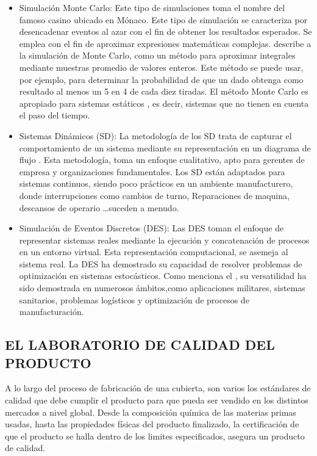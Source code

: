 \begin{itemize}
	\item Simulación Monte Carlo: Este tipo de simulaciones toma el nombre
		del famoso casino ubicado en Mónaco.
		Este tipo de simulación se caracteriza por desencadenar eventos al azar
		con el fin de obtener los resultados esperados.
		Se emplea con el fin de aproximar
		expresiones matemáticas complejas.
		\citet{owen2016monte} describe a la simulación de Monte Carlo,
		como un método para aproximar integrales
		mediante muestras promedio de valores enteros.
		Este método se puede usar, por ejemplo,
		para determinar la probabilidad de que
		un dado obtenga como resultado
		al menos un 5 en 4 de cada diez tiradas.
		El método Monte Carlo es apropiado para sistemas estáticos
		\citep{lawson2008monte},
		es decir, sistemas que no tienen en cuenta el paso del tiempo. 
		
	\item Sistemas Dinámicos (SD): La metodología de los SD trata de capturar
		el comportamiento de un sistema mediante
		su representación en un diagrama de flujo
		\citep{sweetser1999comparison}.
		Esta metodología, toma un enfoque cualitativo,
		apto para gerentes de empresa y organizaciones fundamentales.
		Los SD están adaptados para sistemas continuos,
		siendo poco prácticos en un ambiente manufacturero,
		donde interrupciones como cambios de turno,
		Reparaciones de maquina, descansos de operario \ldots suceden a menudo.

	\item Simulación de Eventos Discretos (DES):
		Las DES toman el enfoque de representar sistemas reales
		mediante la ejecución y concatenación
		de procesos en un entorno virtual.
		Esta representación computacional, se asemeja al sistema real.
		La DES ha demostrado su capacidad de resolver
		problemas de optimización en sistemas estocásticos.
		Como menciona el \citet	{allen2011introduction},
		su versatilidad ha sido demostrada en numerosos ámbitos,como
		aplicaciones militares,
		sistemas sanitarios,
		problemas logísticos
		y optimización de procesos de manufacturación.
\end{itemize}

\subsection{EL LABORATORIO DE CALIDAD DEL \newline PRODUCTO}

A lo largo del proceso de fabricación de una cubierta,
son varios los estándares de calidad que debe cumplir el producto
para que pueda ser vendido en los distintos mercados a nivel global.
Desde la composición química de las materias primas usadas,
hasta las propiedades físicas del producto finalizado,
la certificación de que el producto se halla dentro de los limites especificados,
asegura un producto de calidad.


